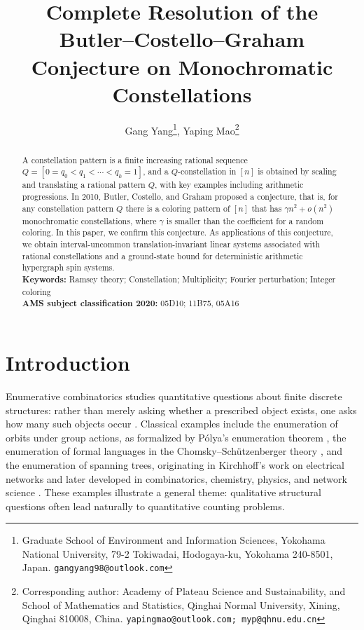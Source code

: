 \documentclass[twoside,12pt]{article}
\newcommand{\1}{\mathbf 1}
\begin{document}
\title{\textbf{Complete Resolution of the Butler--Costello--Graham Conjecture on Monochromatic Constellations}}

\author{Gang Yang\footnote{Graduate School of Environment and Information Sciences, Yokohama
National University, 79-2 Tokiwadai, Hodogaya-ku, Yokohama 240-8501,
Japan. {\tt gangyang98@outlook.com}},\quad
Yaping Mao\footnote{Corresponding author: Academy of Plateau
Science and Sustainability, and School of Mathematics and Statistics, Qinghai Normal University, Xining, Qinghai 810008, China. {\tt yapingmao@outlook.com; myp@qhnu.edu.cn}}}
\date{}
\maketitle

\begin{abstract}
A constellation pattern is a finite increasing rational sequence
\(Q=[0=q_0<q_1<\cdots<q_k=1]\), and a \(Q\)-constellation in
\([n]\) is obtained by scaling and translating a rational pattern $Q$, with key examples including arithmetic progressions. In 2010,
Butler, Costello, and Graham proposed a conjecture, that is, 
for any constellation pattern $Q$ there is a coloring pattern of $[n]$ that has $\gamma n^2+o\left(n^2\right)$ monochromatic constellations, where $\gamma$ is smaller than the coefficient for a random coloring. In this paper, we confirm this conjecture. As applications of this conjecture, we obtain interval-uncommon translation-invariant linear systems associated with rational constellations and a ground-state bound for deterministic arithmetic hypergraph spin systems. 
\\[2mm]
{\bf Keywords:} Ramsey theory; Constellation; Multiplicity; Fourier perturbation; Integer coloring\\[2mm]
{\bf AMS subject classification 2020:} 05D10; 11B75, 05A16\\[2mm]
\end{abstract}

\section{Introduction}\label{sec:introduction}

Enumerative combinatorics studies quantitative questions about finite
discrete structures: rather than merely asking whether a prescribed object
exists, one asks how many such objects occur \cite{Stanley99}.  Classical
examples include the enumeration of orbits under group actions, as formalized
by P\'olya's enumeration theorem \cite{Polya37}, the enumeration of formal
languages in the Chomsky--Sch\"utzenberger theory \cite{ChomskySchutzenberger63},
and the enumeration of spanning trees, originating in Kirchhoff's work on
electrical networks and later developed in combinatorics, chemistry, physics,
and network science \cite{Kirchhoff47,Mallion75,McKay83,Lyons05,ZLWZ11}.
These examples illustrate a general theme: qualitative structural questions
often lead naturally to quantitative counting problems.
\end{document}

